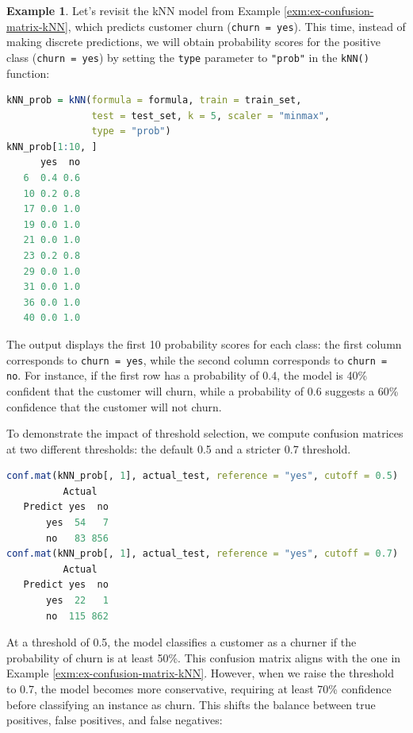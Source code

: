 \documentclass[
  11pt,
]{book}
\newcommand{\passthrough}[1]{#1}
\theoremstyle{definition}
\theoremstyle{definition}
\newtheorem{example}{Example}[chapter]
\theoremstyle{definition}
\theoremstyle{definition}
\theoremstyle{remark}
\begin{document}
\begin{example}
\protect\hypertarget{exm:ex-confusion-matrix-kNN-prob}{}\label{exm:ex-confusion-matrix-kNN-prob}Let's revisit the kNN model from Example \ref{exm:ex-confusion-matrix-kNN}, which predicts customer churn (\passthrough{\lstinline!churn = yes!}). This time, instead of making discrete predictions, we will obtain probability scores for the positive class (\passthrough{\lstinline!churn = yes!}) by setting the \passthrough{\lstinline!type!} parameter to \passthrough{\lstinline!"prob"!} in the \passthrough{\lstinline!kNN()!} function:

\begin{lstlisting}[language=R]
kNN_prob = kNN(formula = formula, train = train_set, 
               test = test_set, k = 5, scaler = "minmax",
               type = "prob")
kNN_prob[1:10, ]
      yes  no
   6  0.4 0.6
   10 0.2 0.8
   17 0.0 1.0
   19 0.0 1.0
   21 0.0 1.0
   23 0.2 0.8
   29 0.0 1.0
   31 0.0 1.0
   36 0.0 1.0
   40 0.0 1.0
\end{lstlisting}

The output displays the first 10 probability scores for each class: the first column corresponds to \passthrough{\lstinline!churn = yes!}, while the second column corresponds to \passthrough{\lstinline!churn = no!}. For instance, if the first row has a probability of 0.4, the model is 40\% confident that the customer will churn, while a probability of 0.6 suggests a 60\% confidence that the customer will not churn.

To demonstrate the impact of threshold selection, we compute confusion matrices at two different thresholds: the default 0.5 and a stricter 0.7 threshold.

\begin{lstlisting}[language=R]
conf.mat(kNN_prob[, 1], actual_test, reference = "yes", cutoff = 0.5)
          Actual
   Predict yes  no
       yes  54   7
       no   83 856
conf.mat(kNN_prob[, 1], actual_test, reference = "yes", cutoff = 0.7)
          Actual
   Predict yes  no
       yes  22   1
       no  115 862
\end{lstlisting}

At a threshold of 0.5, the model classifies a customer as a churner if the probability of churn is at least 50\%. This confusion matrix aligns with the one in Example \ref{exm:ex-confusion-matrix-kNN}. However, when we raise the threshold to 0.7, the model becomes more conservative, requiring at least 70\% confidence before classifying an instance as churn. This shifts the balance between true positives, false positives, and false negatives:


\end{example}
\end{document}
